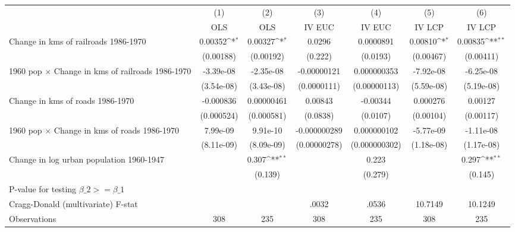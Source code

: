 {
\def\sym#1{\ifmmode^{#1}\else\(^{#1}\)\fi}
\begin{tabular}{l*{6}{c}}
\hline\hline
                &\multicolumn{1}{c}{(1)}&\multicolumn{1}{c}{(2)}&\multicolumn{1}{c}{(3)}&\multicolumn{1}{c}{(4)}&\multicolumn{1}{c}{(5)}&\multicolumn{1}{c}{(6)}\\
                &\multicolumn{1}{c}{OLS}&\multicolumn{1}{c}{OLS}&\multicolumn{1}{c}{IV EUC}&\multicolumn{1}{c}{IV EUC}&\multicolumn{1}{c}{IV LCP}&\multicolumn{1}{c}{IV LCP}\\
\hline
Change in kms of railroads 1986-1970&  0.00352\sym{*}  &  0.00327\sym{*}  &   0.0296         &0.0000891         &  0.00810\sym{*}  &  0.00835\sym{**} \\
                &(0.00188)         &(0.00192)         &  (0.222)         & (0.0193)         &(0.00467)         &(0.00411)         \\
[1em]
1960 pop $\times$ Change in kms of railroads 1986-1970&-3.39e-08         &-2.35e-08         &-0.00000121         &0.000000353         &-7.92e-08         &-6.25e-08         \\
                &(3.54e-08)         &(3.43e-08)         &(0.0000111)         &(0.00000113)         &(5.59e-08)         &(5.19e-08)         \\
[1em]
Change in kms of roads 1986-1970&-0.000836         &0.00000461         &  0.00843         & -0.00344         & 0.000276         &  0.00127         \\
                &(0.000524)         &(0.000581)         & (0.0838)         & (0.0107)         &(0.00104)         &(0.00117)         \\
[1em]
1960 pop $\times$ Change in kms of roads 1986-1970& 7.99e-09         & 9.91e-10         &-0.000000289         &0.000000102         &-5.77e-09         &-1.11e-08         \\
                &(8.11e-09)         &(8.09e-09)         &(0.00000278)         &(0.000000302)         &(1.18e-08)         &(1.17e-08)         \\
[1em]
Change in log urban population 1960-1947&                  &    0.307\sym{**} &                  &    0.223         &                  &    0.297\sym{**} \\
                &                  &  (0.139)         &                  &  (0.279)         &                  &  (0.145)         \\
\hline
P-value for testing $\beta\_{2} >= \beta\_{1}$&                  &                  &                  &                  &                  &                  \\
Cragg-Donald (multivariate) F-stat&                  &                  &    .0032         &    .0536         &  10.7149         &  10.1249         \\
Observations    &      308         &      235         &      308         &      235         &      308         &      235         \\
\hline\hline
\end{tabular}
}
